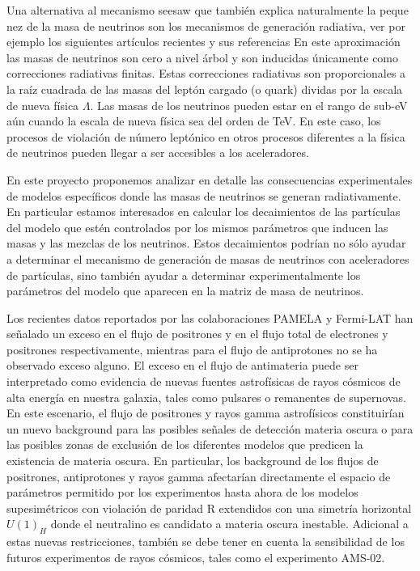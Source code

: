 Una alternativa al mecanismo seesaw que también explica naturalmente
la peque nez de la masa de neutrinos son los mecanismos de generación
radiativa, ver por ejemplo los siguientes artículos recientes y
sus referencias
En este aproximación las masas de neutrinos son cero a nivel árbol y
son inducidas únicamente como correcciones radiativas finitas.  Estas
correcciones radiativas son proporcionales a la raíz cuadrada de
las masas del leptón cargado (o quark) dividas por la escala de nueva
física $\Lambda$. Las masas de los neutrinos pueden estar en el rango
de sub-eV aún cuando la escala de nueva física sea del orden de
TeV. En este caso, los procesos de violación de número leptónico en
otros procesos diferentes a la física de neutrinos pueden llegar
a ser accesibles a los aceleradores.

En este proyecto proponemos analizar en detalle las consecuencias
experimentales de modelos específicos donde las masas de
neutrinos se generan radiativamente. En particular estamos interesados
en calcular los decaimientos de las partículas del modelo que
estén controlados por los mismos parámetros que inducen las masas y
las mezclas de los neutrinos. Estos decaimientos podrían no sólo
ayudar a determinar el mecanismo de generación de masas de neutrinos
con aceleradores de partículas, sino también ayudar a determinar
experimentalmente los parámetros del modelo que aparecen en la matriz
de masa de neutrinos.



Los recientes datos reportados por las colaboraciones PAMELA y Fermi-LAT
han señalado un exceso en el flujo de positrones y en el flujo total de 
electrones y positrones respectivamente, mientras para el flujo de antiprotones no se 
ha observado exceso alguno. El exceso en el flujo de antimateria puede ser 
interpretado como evidencia de nuevas fuentes astrofísicas de rayos cósmicos de 
alta energía en nuestra galaxia, tales como pulsares o remanentes de supernovas. 
En este escenario, el flujo de positrones y rayos gamma astrofísicos constituirían 
un nuevo background para las posibles señales de detección materia oscura o para las posibles zonas 
de exclusión de los diferentes modelos que predicen la existencia de materia oscura. En particular, 
los background de los flujos de positrones, antiprotones y rayos gamma afectarían directamente 
el espacio de parámetros permitido por los experimentos hasta ahora de los modelos 
supesimétricos con violación de paridad R extendidos con una simetría horizontal 
$U(1)_H$ donde el neutralino es candidato a materia oscura inestable. Adicional a 
estas nuevas restricciones, también se debe tener en cuenta la sensibilidad de 
los futuros experimentos de rayos cósmicos, tales como el experimento AMS-02.

